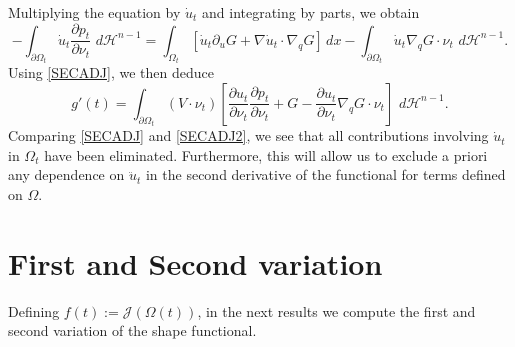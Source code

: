 \documentclass[oneside,a4paper,11pt,notitlepage]{article}
\newcommand{\dH}{\,d\mathcal{H}^{n-1}}
\theoremstyle{definition}
\theoremstyle{plain}
\theoremstyle{definition}
\begin{document}
Multiplying the equation by $\dot{u}_t$ and integrating by parts, we obtain
\begin{equation*}
    -\int_{\partial\Omega_t}\dot{u}_t\frac{\partial p_t}{\partial\nu_t}\,\dH
    =
    \int_{\Omega_t}[\dot{u}_t\partial_uG+\nabla \dot{u}_t\cdot\nabla_q G]\,dx
    -\int_{\partial\Omega_t}\dot{u}_t\nabla_q G\cdot\nu_t\,\dH.
\end{equation*}
Using \eqref{SECADJ}, we then deduce
\begin{equation}\label{SECADJ2}
    g'(t)=\int_{\partial\Omega_t}(V\cdot\nu_t)\left[\frac{\partial u_t}{\partial\nu_t}\frac{\partial p_t}{\partial\nu_t}+G-\frac{\partial u_t}{\partial\nu_t}\nabla_q G\cdot\nu_t \right]\,\dH.
\end{equation}
Comparing \eqref{SECADJ} and \eqref{SECADJ2}, we see that all contributions involving $\dot{u}_t$ in $\Omega_t$ have been eliminated. Furthermore, this will allow us to exclude a priori any dependence on $\ddot{u}_t$ in the second derivative of the functional for terms defined on $\Omega$.
\section{First and Second variation}\label{derivatives}
Defining $f(t):=\mathcal{J}(\Omega(t))$, in the next results we compute the first and second variation of the shape functional.
\end{document}
